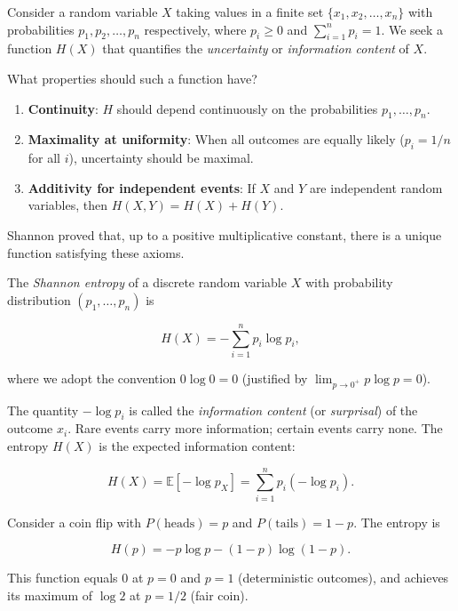 Consider a random variable $X$ taking values in a finite set $\{x_1, x_2, \ldots, x_n\}$ with probabilities $p_1, p_2, \ldots, p_n$ respectively, where $p_i \geq 0$ and $\sum_{i=1}^n p_i = 1$. We seek a function $H(X)$ that quantifies the \textit{uncertainty} or \textit{information content} of $X$.

What properties should such a function have?

\begin{enumerate}[nosep]
  \item \textbf{Continuity}: $H$ should depend continuously on the probabilities $p_1, \ldots, p_n$.
  \item \textbf{Maximality at uniformity}: When all outcomes are equally likely ($p_i = 1/n$ for all $i$), uncertainty should be maximal.
  \item \textbf{Additivity for independent events}: If $X$ and $Y$ are independent random variables, then $H(X, Y) = H(X) + H(Y)$.
\end{enumerate}

Shannon proved that, up to a positive multiplicative constant, there is a unique function satisfying these axioms.

\begin{definition}\label{def:11.1}
The \textit{Shannon entropy} of a discrete random variable $X$ with probability distribution $(p_1, \ldots, p_n)$ is

\[
H(X) = -\sum_{i=1}^n p_i \log p_i,
\]

where we adopt the convention $0 \log 0 = 0$ (justified by $\lim_{p \to 0^+} p \log p = 0$).

The quantity $-\log p_i$ is called the \textit{information content} (or \textit{surprisal}) of the outcome $x_i$. Rare events carry more information; certain events carry none. The entropy $H(X)$ is the expected information content:

\[
H(X) = \mathbb{E}[-\log p_X] = \sum_{i=1}^n p_i (-\log p_i).
\]
\end{definition}


\begin{example}
Consider a coin flip with $P(\text{heads}) = p$ and $P(\text{tails}) = 1 - p$. The entropy is

\[
H(p) = -p \log p - (1-p)\log(1-p).
\]

This function equals $0$ at $p = 0$ and $p = 1$ (deterministic outcomes), and achieves its maximum of $\log 2$ at $p = 1/2$ (fair coin).
\end{example}


